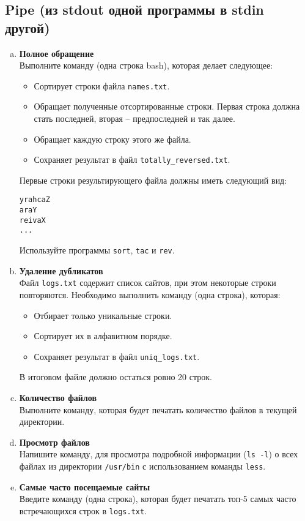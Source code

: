 \documentclass{article}
\begin{document}
\subsection{Pipe (из stdout одной программы в stdin другой)}
\begin{enumerate}[a.]
\item \textbf{Полное обращение}\\
Выполните команду (одна строка bash), которая делает следующее:
\begin{itemize}
\item Сортирует строки файла \texttt{names.txt}. 
\item Обращает полученные отсортированные строки. Первая строка должна стать последней, вторая -- предпоследней и так далее.
\item Обращает каждую строку этого же файла.
\item Сохраняет результат в файл \texttt{totally\_reversed.txt}.
\end{itemize}
Первые строки результирующего файла должны иметь следующий вид:
\begin{lstlisting}
yrahcaZ
araY
reivaX
...
\end{lstlisting}
Используйте программы \texttt{sort}, \texttt{tac} и \texttt{rev}.

\item \textbf{Удаление дубликатов}\\
Файл \texttt{logs.txt} содержит список сайтов, при этом некоторые строки повторяются.
Необходимо выполнить команду (одна строка), которая:
\vspace{-2mm}
\begin{itemize}
\item Отбирает только уникальные строки.
\item Сортирует их в алфавитном порядке.
\item Сохраняет результат в файл \texttt{uniq\_logs.txt}.
\end{itemize}
В итоговом файле должно остаться ровно 20 строк.

\item \textbf{Количество файлов}\\
Выполните команду, которая будет печатать количество файлов в текущей директории.

\item \textbf{Просмотр файлов}\\
Напишите команду, для просмотра подробной информации (\texttt{ls -l}) о всех файлах из директории \texttt{/usr/bin} с использованием команды \texttt{less}.

\item \textbf{Самые часто посещаемые сайты}\\
Введите команду (одна строка), которая будет печатать топ-5 самых часто встречающихся строк в \texttt{logs.txt}.
\end{enumerate}
\end{document}
